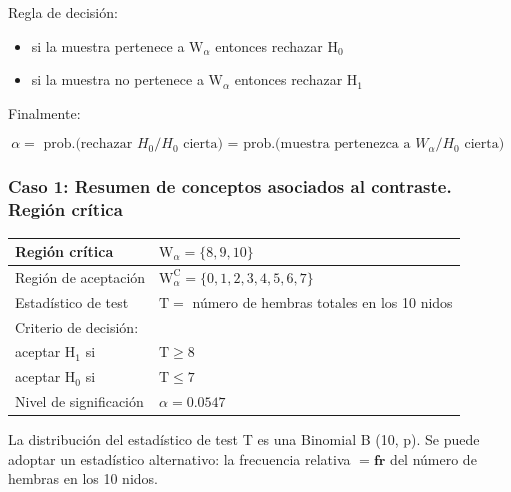 \documentclass[
]{article}
\providecommand{\tightlist}{%
  \setlength{\itemsep}{0pt}\setlength{\parskip}{0pt}}
\begin{document}
Regla de decisión:

\begin{itemize}
\tightlist
\item
  si la muestra pertenece a \(\mathrm{W}_{\alpha}\) entonces rechazar \(\mathrm{H}_{0}\)\\
\item
  si la muestra no pertenece a \(\mathrm{W}_{\alpha}\) entonces rechazar \(\mathrm{H}_{1}\)
\end{itemize}

Finalmente:

\[
\alpha=\text { prob.(rechazar } H_{0} / H_{0} \text { cierta) = prob.(muestra pertenezca a } W_{\alpha} / H_{0} \text { cierta) }
\]

\subsubsection{Caso 1: Resumen de conceptos asociados al contraste. Región crítica}\label{caso-1-resumen-de-conceptos-asociados-al-contraste.-regiuxf3n-cruxedtica}

\begin{longtable}[]{@{}
  >{\raggedright\arraybackslash}p{}
  >{\centering\arraybackslash}p{}@{}}
\toprule\noalign{}
\begin{minipage}[b]{\linewidth}\raggedright
Región crítica
\end{minipage} & \begin{minipage}[b]{\linewidth}\centering
\(\mathrm{W}_{\alpha}=\{8,9,10\}\)
\end{minipage} \\
\midrule\noalign{}
\endhead
\bottomrule\noalign{}
\endlastfoot
Región de aceptación & \(\mathrm{W}_{\alpha}^{\mathrm{C}}=\{0,1,2,3,4,5,6,7\}\) \\
Estadístico de test & \(\mathrm{T}=\) número de hembras totales en los 10 nidos \\
Criterio de decisión: & \\
aceptar \(\mathrm{H}_{1}\) si & \(\mathrm{T} \geq 8\) \\
aceptar \(\mathrm{H}_{0}\) si & \(\mathrm{T} \leq 7\) \\
Nivel de significación & \(\alpha=0.0547\) \\
\end{longtable}

La distribución del estadístico de test T es una Binomial B (10, p). Se puede adoptar un estadístico alternativo: la frecuencia relativa \(=\mathbf{f r}\) del número de hembras en los 10 nidos.
\end{document}
